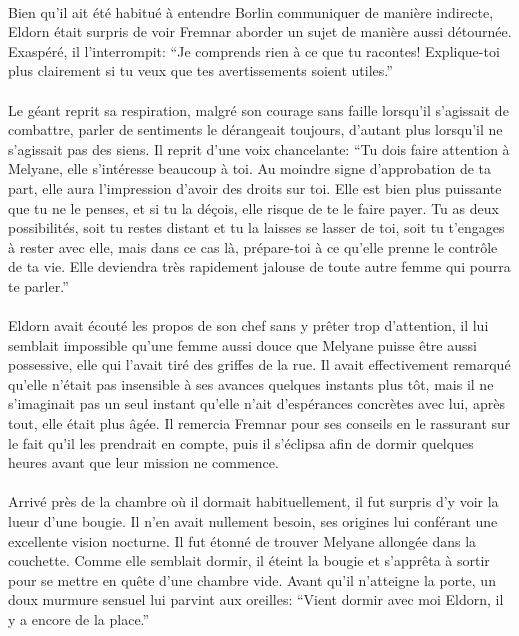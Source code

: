\paragraph{}
Bien qu'il ait été habitué à entendre Borlin communiquer de manière indirecte,
Eldorn était surpris de voir Fremnar aborder un sujet de manière aussi
détournée. Exaspéré, il l'interrompit: ``Je comprends rien à ce que tu
racontes! Explique-toi plus clairement si tu veux que tes avertissements
soient utiles.''

\paragraph{}
Le géant reprit sa respiration, malgré son courage sans faille lorsqu'il
s'agissait de combattre, parler de sentiments le dérangeait toujours, d'autant
plus lorsqu'il ne s'agissait pas des siens. Il reprit d'une voix chancelante:
``Tu dois faire attention à Melyane, elle s'intéresse beaucoup à toi. Au
moindre signe d'approbation de ta part, elle aura l'impression d'avoir des
droits sur toi. Elle est bien plus puissante que tu ne le penses, et si tu la
déçois, elle risque de te le faire payer. Tu as deux possibilités, soit tu
restes distant et tu la laisses se lasser de toi, soit tu t'engages à rester
avec elle, mais dans ce cas là, prépare-toi à ce qu'elle prenne le contrôle de
ta vie. Elle deviendra très rapidement jalouse de toute autre femme qui pourra
te parler.''

\paragraph{}
Eldorn avait écouté les propos de son chef sans y prêter trop d'attention, il
lui semblait impossible qu'une femme aussi douce que Melyane puisse être aussi
possessive, elle qui l'avait tiré des griffes de la rue. Il avait
effectivement remarqué qu'elle n'était pas insensible à ses avances quelques
instants plus tôt, mais il ne s'imaginait pas un seul instant qu'elle n'ait
d'espérances concrètes avec lui, après tout, elle était plus âgée. Il
remercia Fremnar pour ses conseils en le rassurant sur le fait qu'il les
prendrait en compte, puis il s'éclipsa afin de dormir quelques heures avant
que leur mission ne commence.

\paragraph{}
Arrivé près de la chambre où il dormait habituellement, il fut surpris d'y
voir la lueur d'une bougie. Il n'en avait nullement besoin, ses origines lui
conférant une excellente vision nocturne. Il fut étonné de trouver Melyane
allongée dans la couchette. Comme elle semblait dormir, il éteint la bougie et
s'apprêta à sortir pour se mettre en quête d'une chambre vide. Avant qu'il
n'atteigne la porte, un doux murmure sensuel lui parvint aux oreilles: ``Vient
dormir avec moi Eldorn, il y a encore de la place.''

